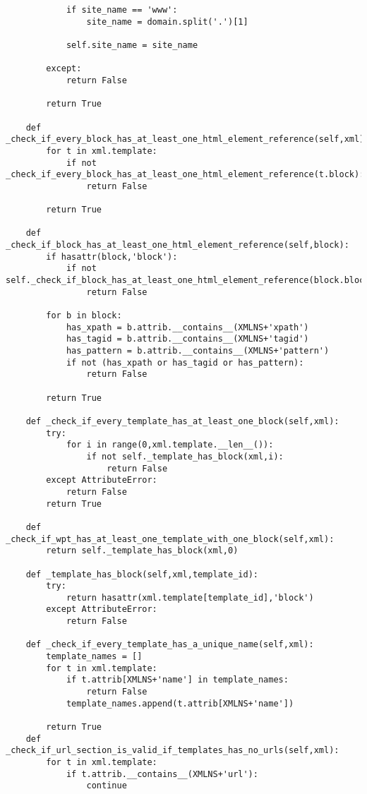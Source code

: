\begin{lstlisting}
            if site_name == 'www':
                site_name = domain.split('.')[1]

            self.site_name = site_name

        except:
            return False
    
        return True

    def _check_if_every_block_has_at_least_one_html_element_reference(self,xml):
        for t in xml.template:
            if not _check_if_every_block_has_at_least_one_html_element_reference(t.block):
                return False

        return True
   
    def _check_if_block_has_at_least_one_html_element_reference(self,block):
        if hasattr(block,'block'): 
            if not self._check_if_block_has_at_least_one_html_element_reference(block.block):
                return False

        for b in block:
            has_xpath = b.attrib.__contains__(XMLNS+'xpath')
            has_tagid = b.attrib.__contains__(XMLNS+'tagid')
            has_pattern = b.attrib.__contains__(XMLNS+'pattern')
            if not (has_xpath or has_tagid or has_pattern):
                return False

        return True
 
    def _check_if_every_template_has_at_least_one_block(self,xml):
        try:
            for i in range(0,xml.template.__len__()):
                if not self._template_has_block(xml,i):
                    return False
        except AttributeError:
            return False
        return True

    def _check_if_wpt_has_at_least_one_template_with_one_block(self,xml):
        return self._template_has_block(xml,0)

    def _template_has_block(self,xml,template_id):
        try:
            return hasattr(xml.template[template_id],'block')
        except AttributeError:
            return False
   
    def _check_if_every_template_has_a_unique_name(self,xml):
        template_names = []
        for t in xml.template:
            if t.attrib[XMLNS+'name'] in template_names:
                return False
            template_names.append(t.attrib[XMLNS+'name'])

        return True
    def _check_if_url_section_is_valid_if_templates_has_no_urls(self,xml):
        for t in xml.template:
            if t.attrib.__contains__(XMLNS+'url'):
                continue


\end{lstlisting}
